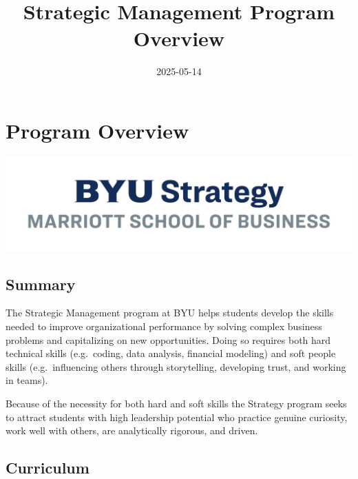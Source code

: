 \documentclass[
  letterpaper,
  DIV=11,
  numbers=noendperiod]{scrreprt}
\title{Strategic Management Program Overview}
\author{}
\date{2025-05-14}
\renewcommand*\contentsname{Table of contents}
\newcommand\contentsname{Table of contents}
\begin{document}
\maketitle

\renewcommand*\contentsname{Table of contents}
{
\hypersetup{linkcolor=}
\setcounter{tocdepth}{2}
\tableofcontents
}


\chapter{Program Overview}\label{program-overview}

\begin{center}
\includegraphics{images/Strategy_Centered_blue_grey.png}
\end{center}

\section*{Summary}\label{summary}


The Strategic Management program at BYU helps students develop the
skills needed to improve organizational performance by solving complex
business problems and capitalizing on new opportunities. Doing so
requires both hard technical skills (e.g.~coding, data analysis,
financial modeling) and soft people skills (e.g.~influencing others
through storytelling, developing trust, and working in teams).

Because of the necessity for both hard and soft skills the Strategy
program seeks to attract students with high leadership potential who
practice genuine curiosity, work well with others, are analytically
rigorous, and driven.

\section*{Curriculum}\label{curriculum}
\end{document}
